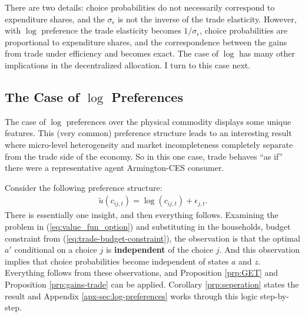 \documentclass[12pt,pdftex]{article}
\begin{document}
\begin{onehalfspacing}
There are two details: choice probabilities do not necessarily correspond to expenditure shares, and the $\sigma_{\epsilon}$ is not the inverse of the trade elasticity. However, with $\log$ preference the trade elasticity becomes $1 / \sigma_{\epsilon}$, choice probabilities are proportional to expenditure shares, and the correspondence between the gains from trade under efficiency and \citet{arkolakis2012new} becomes exact. The case of $\log$ has many other implications in the decentralized allocation. I turn to this case next.

\subsection{The Case of $\log$ Preferences}\label{sec:log-preferences}

The case of $\log$ preferences over the physical commodity displays some unique features. This (very common) preference structure leads to an interesting result where micro-level heterogeneity and market incompleteness completely separate from the trade side of the economy. So in this one case, trade behaves ``as if'' there were a representative agent Armington-CES consumer.

Consider the following preference structure:
\begin{align}
\tilde{u}( c_{ij,t} ) =  \log(c_{ij,t}) + \epsilon_{j,t}. \nonumber
\end{align}
There is essentially one insight, and then everything follows. Examining the problem in (\ref{eq:value_fun_option}) and substituting in the households, budget constraint from (\ref{eq:trade-budget-constraint}), the observation is that the optimal $a'$ conditional on a choice $j$ is \textbf{independent} of the choice $j$. And this observation implies that choice probabilities become independent of states $a$ and $z$. Everything follows from these observations, and Proposition \ref{prp:GET} and Proposition \ref{prp:gains-trade} can be applied. Corollary \ref{prp:seperation} states the result and Appendix \ref{apx-sec:log-preferences} works through this logic step-by-step.


\end{onehalfspacing}
\end{document}
